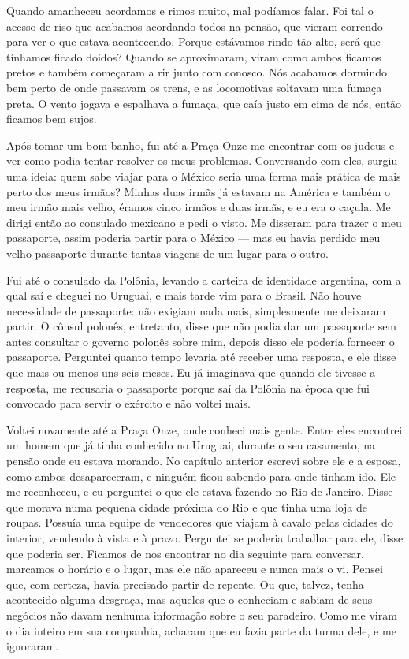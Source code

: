 Quando amanheceu acordamos e rimos muito, mal podíamos falar. Foi tal o
acesso de riso que acabamos acordando todos na pensão, que vieram
correndo para ver o que estava acontecendo. Porque estávamos rindo tão
alto, será que tínhamos ficado doidos? Quando se aproximaram, viram
como ambos ficamos pretos e também começaram a rir junto com conosco.
Nós acabamos dormindo bem perto de onde passavam os trens, e as
locomotivas soltavam uma fumaça preta. O vento jogava e espalhava a
fumaça, que caía justo em cima de nós, então ficamos bem sujos.

Após tomar um bom banho, fui até a Praça Onze me encontrar com os judeus
e ver como podia tentar resolver os meus problemas. Conversando com eles, surgiu
uma ideia: quem sabe viajar para o México seria uma forma mais prática de mais perto dos
meus irmãos? Minhas duas irmãs já estavam na América e também o meu
irmão mais velho, éramos cinco irmãos e duas irmãs, e eu era o caçula.
Me dirigi então ao consulado mexicano e pedi o visto. Me disseram para
trazer o meu passaporte, assim poderia partir para o
México --- mas eu havia perdido meu velho passaporte durante tantas
viagens de um lugar para o outro.

Fui até o consulado da Polônia, levando a carteira de identidade
argentina, com a qual saí e cheguei no Uruguai, e mais tarde vim para o
Brasil. Não houve necessidade de passaporte: não exigiam nada mais,
simplesmente me deixaram partir. O cônsul polonês, entretanto, disse que
não podia dar um passaporte sem antes consultar o governo polonês sobre
mim, depois disso ele poderia fornecer o passaporte.
Perguntei quanto tempo levaria até receber uma resposta, e ele disse
que mais ou menos uns seis meses. Eu já imaginava que quando ele tivesse
a resposta, me recusaria o passaporte porque saí da Polônia na época que
fui convocado para servir o exército e não voltei mais. 


Voltei novamente até a Praça Onze, onde conheci mais gente. Entre
eles encontrei um homem que já tinha conhecido no Uruguai, durante o seu
casamento, na pensão onde eu estava morando. No capítulo anterior 
escrevi sobre ele e a esposa, como ambos desapareceram, e ninguém
ficou sabendo para onde tinham ido. Ele me reconheceu, e eu perguntei o
que ele estava fazendo no Rio de Janeiro. Disse que morava numa
pequena cidade próxima do Rio e que tinha uma loja de roupas. Possuía uma 
equipe de vendedores que viajam à cavalo pelas cidades do
interior, vendendo à vista e à prazo. Perguntei se poderia trabalhar para
ele, disse que poderia ser. Ficamos de nos encontrar no dia seguinte
para conversar, marcamos o horário e o lugar, mas ele não apareceu e
nunca mais o vi. Pensei que, com certeza, havia precisado partir de
repente. Ou que, talvez, tenha acontecido alguma desgraça, mas
aqueles que o conheciam e sabiam de seus negócios não davam nenhuma
informação sobre o seu paradeiro. Como me viram o dia inteiro em sua
companhia, acharam que eu fazia parte da turma dele, e me ignoraram.

